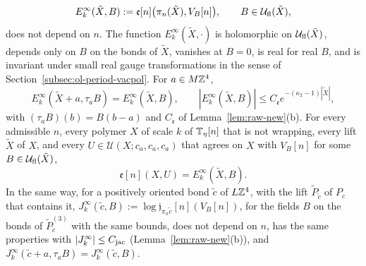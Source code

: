 \begin{proposition}
\begin{enumerate}[label=(\alph*)]
\[
E^\infty_k(\tilde X,B):=\mathfrak e[n]\big(\pi_n(\tilde X),V_B[n]\big),\qquad B\in\mathcal U_{\rm fl}(\tilde X),
\]
does not depend on $n$. The function $E^\infty_k(\tilde X,\cdot)$ is holomorphic on $\mathcal U_{\rm fl}(\tilde X)$, depends only on $B$ on the bonds of $\tilde X$, vanishes at $B=0$, is real for real $B$, and is invariant under small real gauge transformations in the sense of Section~\ref{subsec:ol-period-vacpol}. For $a\in M\mathbb Z^4$,
\[
E^\infty_k(\tilde X+a,\tau_aB)=E^\infty_k(\tilde X,B),\qquad|E^\infty_k(\tilde X,B)|\le C_{\mathfrak e}e^{-(\kappa_2-1)|\tilde X|},
\]
with $(\tau_aB)(b)=B(b-a)$ and $C_{\mathfrak e}$ of Lemma~\ref{lem:raw-new}(b). For every admissible $n$, every polymer $X$ of scale $k$ of $\mathbb T_\eta[n]$ that is not wrapping, every lift $\tilde X$ of $X$, and every $U\in\mathcal U(X;c_a,c_a,c_a)$ that agrees on $X$ with $V_B[n]$ for some $B\in\mathcal U_{\rm fl}(\tilde X)$,
\[
\mathfrak e[n](X,U)=E^\infty_k(\tilde X,B).
\]
In the same way, for a positively oriented bond $\tilde c$ of $L\mathbb Z^4$, with the lift $\tilde P_{\tilde c}$ of $P_c$ that contains it, $J^\infty_k(\tilde c,B):=\log\mathfrak j_{\pi_n\tilde c}[n](V_B[n])$, for the fields $B$ on the bonds of $\tilde P_{\tilde c}^{(3)}$ with the same bounds, does not depend on $n$, has the same properties with $|J^\infty_k|\le C_{\rm jac}$ (Lemma~\ref{lem:raw-new}(b)), and $J^\infty_k(\tilde c+a,\tau_aB)=J^\infty_k(\tilde c,B)$.
\end{enumerate}
\end{proposition}

